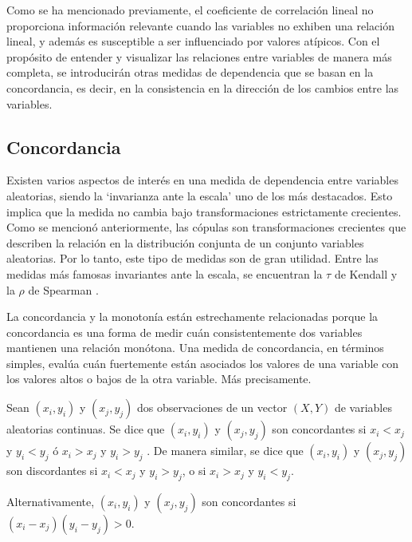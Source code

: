 Como se ha mencionado previamente, el coeficiente de correlación lineal no proporciona información relevante cuando las variables no exhiben una relación lineal, y además es susceptible a ser influenciado por valores atípicos. Con el propósito de entender y visualizar las relaciones entre variables de manera más completa, se introducirán otras medidas de dependencia que se basan en la concordancia, es decir, en la consistencia en la dirección de los cambios entre las variables.




\subsection{Concordancia}

Existen varios aspectos de interés en una medida de dependencia entre variables aleatorias, siendo la `invarianza ante la escala' uno de los más destacados. Esto implica que la medida no cambia bajo transformaciones estrictamente crecientes. Como se mencionó anteriormente, las cópulas son transformaciones crecientes que describen la relación en la distribución conjunta de un conjunto variables aleatorias. Por lo tanto, este tipo de medidas son de gran utilidad. Entre las medidas más famosas invariantes ante la escala, se encuentran la $\tau$ de Kendall y la $\rho$ de Spearman \cite{czadoAnalyzing}.

La concordancia y la monotonía están estrechamente relacionadas porque la concordancia es una forma de medir cuán consistentemente dos variables mantienen una relación monótona. Una medida de concordancia, en términos simples, evalúa cuán fuertemente están asociados los valores de una variable con los valores altos o bajos de la otra variable. Más precisamente. 

\begin{defn}[Concordancia]
    Sean $(x_i, y_i)$ y $(x_j, y_j)$ dos observaciones de un vector $(X, Y)$ de variables aleatorias continuas. Se dice que $(x_i, y_i)$ y $(x_j, y_j)$ son concordantes si $x_i < x_j$ y $y_i < y_j$ ó $x_i > x_j$ y $y_i > y_j$ . De manera similar, se dice que $(x_i, y_i)$ y $(x_j, y_j)$ son discordantes si $x_i < x_j$ y $y_i > y_j$, o si $x_i > x_j$ y $y_i < y_j$. 
    
    Alternativamente, $(x_i, y_i)$ y $(x_j, y_j)$ son concordantes si $(x_i - x_j)(y_i - y_j) > 0$.
\end{defn}

